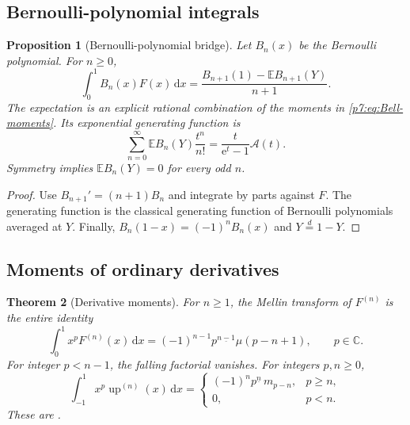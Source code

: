 \documentclass[11pt,oneside]{article}
\newtheorem{theorem}{Theorem}[section]
\newtheorem{proposition}[theorem]{Proposition}
\theoremstyle{definition}
\theoremstyle{remark}
\newcommand{\Up}{\operatorname{up}}
\newcommand{\E}{\mathbb E}
\newcommand{\C}{\mathbb C}
\newcommand{\dd}{\,\mathrm d}
\newcommand{\e}{\mathrm e}
\newcommand{\fall}[2]{#1^{\underline{#2}}}
\newcommand{\1}{\mathbf 1}
\begin{document}
\subsection{Bernoulli-polynomial integrals}

\begin{proposition}[Bernoulli-polynomial bridge]
\label{p7:prop:Bernoulli-polynomial}
Let $B_n(x)$ be the Bernoulli polynomial.  For $n\ge0$,
\begin{equation}
 \int_0^1B_n(x)F(x)\dd x
 =\frac{B_{n+1}(1)-\E B_{n+1}(Y)}{n+1}.
 \label{p7:eq:Bernoulli-F-integral}
\end{equation}
The expectation is an explicit rational combination of the moments in
\cref{p7:eq:Bell-moments}.  Its exponential generating function is
\begin{equation}
 \sum_{n=0}^{\infty}\E B_n(Y)\frac{t^n}{n!}
 =\frac{t}{\e^t-1}\mathscr A(t).
 \label{p7:eq:Bernoulli-expectation-egf}
\end{equation}
Symmetry implies $\E B_n(Y)=0$ for every odd $n$.
\end{proposition}

\begin{proof}
Use $B_{n+1}'=(n+1)B_n$ and integrate by parts against $F$.  The generating function is the
classical generating function of Bernoulli polynomials averaged at $Y$.  Finally,
$B_n(1-x)=(-1)^nB_n(x)$ and $Y\overset d=1-Y$.
\end{proof}

\subsection{Moments of ordinary derivatives}

\begin{theorem}[Derivative moments]
\label{p7:thm:derivative-moments}
For $n\ge1$, the Mellin transform of $F^{(n)}$ is the entire identity
\begin{equation}
 \int_0^1x^pF^{(n)}(x)\dd x
 =(-1)^{n-1}\fall{p}{n-1}\mu(p-n+1),
 \qquad p\in\C.
 \label{p7:eq:F-derivative-moments}
\end{equation}
For integer $p<n-1$, the falling factorial vanishes.  For integers $p,n\ge0$,
\begin{equation}
 \int_{-1}^{1}x^p\Up^{(n)}(x)\dd x
 =\begin{cases}
 (-1)^n\fall p n\,m_{p-n},&p\ge n,\\
 0,&p<n.
 \end{cases}
 \label{p7:eq:up-derivative-moments}
\end{equation}
These are \statusproved.
\end{theorem}
\end{document}
